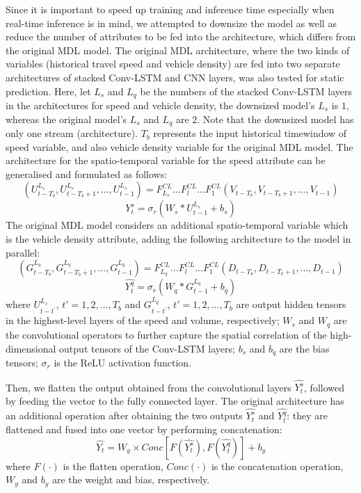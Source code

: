 \documentclass[11pt]{uonthesis}
\begin{document}
Since it is important to speed up training and inference time especially when real-time inference is in mind, we attempted to downsize the model as well as reduce the number of attributes to be fed into the architecture, which differs from the original MDL model. The original MDL architecture, where the two kinds of variables (historical travel speed and vehicle density) are fed into two separate architectures of stacked Conv-LSTM and CNN layers, was also tested for static prediction. Here, let $L_s$ and $L_q$ be the numbers of the stacked Conv-LSTM layers in the architectures for speed and vehicle density, the downsized model's $L_s$ is $1$, whereas the original model's $L_s$ and $L_q$ are $2$. Note that the downsized model has only one stream (architecture). $T_b$ represents the input historical timewindow of speed variable, and also vehicle density variable for the original MDL model. The architecture for the spatio-temporal variable for the speed attribute can be generalised and formulated as follows:
\[ (U^{L_s}_{t-T_b}, U^{L_s}_{t-T_b+1},..., U^{L_s}_{t-1}) = F^{CL}_{L_s}...F^{CL}_{l}...F^{CL}_{1} (V_{t-T_b}, V_{t-T_b+1},..., V_{t-1}) \]
\[ \hat{Y^s_{t}} = {\sigma}_r (W_s\ast{U^{L_s}_{t-1}} + b_s) \]
The original MDL model considers an additional spatio-temporal variable which is the vehicle density attribute, adding the following architecture to the model in parallel:
\[ (G^{L_q}_{t-T_b}, G^{L_q}_{t-T_b+1},...,G^{L_q}_{t-1}) = F^{CL}_{L_q}...F^{CL}_{l}...F^{CL}_{1} (D_{t-T_b}, D_{t-T_b+1},..., D_{t-1}) \]
\[ \hat{Y^q_{t}} = {\sigma}_r (W_q\ast{G^{L_q}_{t-1}} + b_q) \]
where $U^{L_s}_{t-t^{\prime}}$, $t\prime = 1, 2,..., T_b$ and $G^{L_q}_{t-t^{\prime}}$, $t\prime = 1, 2,..., T_b$ are output hidden tensors in the highest-level layers of the speed and volume, respectively; $W_s$ and $W_q$ are the convolutional operators to further capture the spatial correlation of the high-dimensional output tensors of the Conv-LSTM layers; $b_s$ and $b_q$ are the bias tensors; $\sigma_r$ is the ReLU activation function.

Then, we flatten the output obtained from the convolutional layers $\hat{Y^{s}_t}$, followed by feeding the vector to the fully connected layer. The original architecture has an additional operation after obtaining the two outputs $\hat{Y^{s}_t}$ and $\hat{Y^q_t}$: they are flattened and fused into one vector by performing concatenation:
\[ \hat{Y_t} = W_y \times Conc[F(\hat{Y^s_t}), F(\hat{Y^q_t})] + b_y\]
where $F(\cdot)$ is the flatten operation, $Conc(\cdot)$ is the concatenation operation, $W_y$ and $b_y$ are the weight and bias, respectively. %
\end{document}
